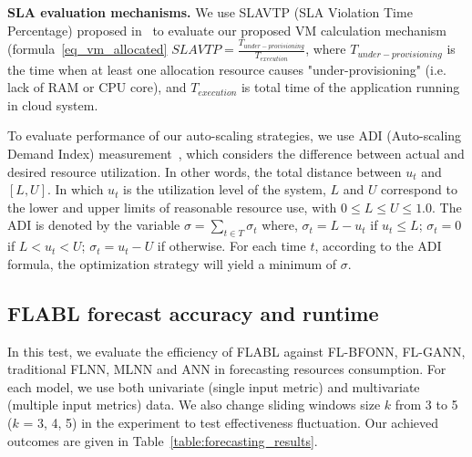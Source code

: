 \documentclass[runningheads]{llncs}
\begin{document}

\textbf{SLA evaluation mechanisms.} We use SLAVTP (SLA Violation Time Percentage) proposed in~\cite{ref_dang} to evaluate our proposed VM calculation mechanism (formula~\ref{eq_vm_allocated} 
	$ SLAVTP = \frac{T_{under-provisioning}}{T_{execution}}$, where 
	$T_{under-provisioning}$ is the time when at least one allocation resource causes "under-provisioning" (i.e. lack of RAM or CPU core), and 
	$T_{execution}$ is total time of the application running in cloud system. 

To evaluate performance of our auto-scaling strategies, we use ADI (Auto-scaling Demand Index) measurement~\cite{ref_netto}, 
which considers the difference between actual and desired resource utilization. In other words, the total distance between $u_t$ and $[L, U]$. In which $u_t$ is the utilization level of the system, $L$ and $U$ correspond to the lower and upper limits of reasonable resource use, with $0 \le L \le U \le 1.0$. The ADI is denoted by the variable $\sigma = \sum_{t \in T}{\sigma_t}$ where, $\sigma_t = L - u_t$ if $u_t \le L$; $\sigma_t = 0$ if $L < u_t <U$; $\sigma_t = u_t -U$ if otherwise. For each time $t$, according to the ADI formula, the optimization strategy will yield a minimum of $\sigma$. 

\subsection{FLABL forecast accuracy and runtime}
\label{predicting_results}

In this test, we evaluate the efficiency of FLABL against FL-BFONN, FL-GANN, traditional FLNN, MLNN and ANN in forecasting resources consumption. For each model, we use both univariate (single input metric) and multivariate (multiple input metrics) data. We also change sliding windows size $k$ from 3 to 5 ($k$ = 3, 4, 5) in the experiment to test effectiveness fluctuation. Our achieved outcomes are given in Table~\ref{table:forecasting_results}.
\end{document}
